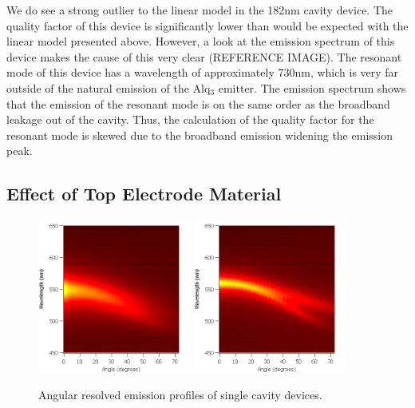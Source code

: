 \documentclass{report}
\begin{document}
            We do see a strong outlier to the linear model in the 182nm cavity device. The quality factor of this device is significantly lower than would be expected with the linear model presented above. However, a look at the emission spectrum of this device makes the cause of this very clear (REFERENCE IMAGE). The resonant mode of this device has a wavelength of approximately 730nm, which is very far outside of the natural emission of the Alq$_3$ emitter. The emission spectrum shows that the emission of the resonant mode is on the same order as the broadband leakage out of the cavity. Thus, the calculation of the quality factor for the resonant mode is skewed due to the broadband emission widening the emission peak.
        
        \subsection{Effect of Top Electrode Material}
            \begin{figure}
                \centering
                \includegraphics[width=0.45\textwidth]{images/n1_ag_top_heatmap.png}
                \includegraphics[width=0.45\textwidth]{images/n1_al_top_heatmap.png}
                \caption{Angular resolved emission profiles of single cavity devices.}
            \end{figure}
\end{document}
